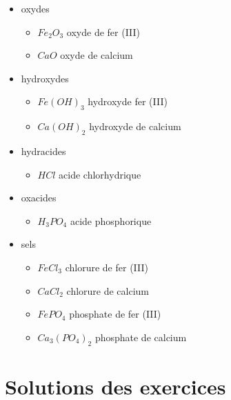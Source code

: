 \documentclass[
  11pt,
  french,
  a4paper,
  openany]{book}
\providecommand{\tightlist}{%
  \setlength{\itemsep}{0pt}\setlength{\parskip}{0pt}}
\begin{document}
\begin{Answer}

\begin{itemize}
\tightlist
\item
  oxydes

  \begin{itemize}
  \tightlist
  \item
    \(Fe_2O_3\) oxyde de fer (III)
  \item
    \(CaO\) oxyde de calcium
  \end{itemize}
\item
  hydroxydes

  \begin{itemize}
  \tightlist
  \item
    \(Fe(OH)_3\) hydroxyde fer (III)
  \item
    \(Ca(OH)_2\) hydroxyde de calcium
  \end{itemize}
\item
  hydracides

  \begin{itemize}
  \tightlist
  \item
    \(HCl\) acide chlorhydrique
  \end{itemize}
\item
  oxacides

  \begin{itemize}
  \tightlist
  \item
    \(H_3PO_4\) acide phosphorique
  \end{itemize}
\item
  sels

  \begin{itemize}
  \tightlist
  \item
    \(FeCl_3\) chlorure de fer (III)
  \item
    \(CaCl_2\) chlorure de calcium
  \item
    \(FePO_4\) phosphate de fer (III)
  \item
    \(Ca_3(PO_4)_2\) phosphate de calcium
  \end{itemize}
\end{itemize}


\end{Answer}

\newpage

\section{Solutions des exercices} \shipoutAnswer
\end{document}
